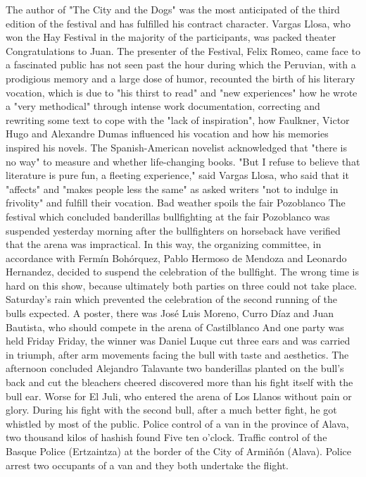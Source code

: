 The author of "The City and the Dogs" was the most anticipated of the third edition of the festival and has fulfilled his contract character.
Vargas Llosa, who won the Hay Festival in the majority of the participants, was packed theater Congratulations to Juan.
The presenter of the Festival, Felix Romeo, came face to a fascinated public has not seen past the hour during which the Peruvian, with a prodigious memory and a large dose of humor, recounted the birth of his literary vocation, which is due to "his thirst to read" and "new experiences" how he wrote a "very methodical" through intense work documentation, correcting and rewriting some text to cope with the "lack of inspiration", how Faulkner, Victor Hugo and Alexandre Dumas influenced his vocation and how his memories inspired his novels.
The Spanish-American novelist acknowledged that "there is no way" to measure and whether life-changing books. "But I refuse to believe that literature is pure fun, a fleeting experience," said Vargas Llosa, who said that it "affects" and "makes people less the same" as asked writers "not to indulge in frivolity" and fulfill their vocation.
Bad weather spoils the fair Pozoblanco
The festival which concluded banderillas bullfighting at the fair Pozoblanco was suspended yesterday morning after the bullfighters on horseback have verified that the arena was impractical.
In this way, the organizing committee, in accordance with Fermín Bohórquez, Pablo Hermoso de Mendoza and Leonardo Hernandez, decided to suspend the celebration of the bullfight.
The wrong time is hard on this show, because ultimately both parties on three could not take place.
Saturday's rain which prevented the celebration of the second running of the bulls expected.
A poster, there was José Luis Moreno, Curro Díaz and Juan Bautista, who should compete in the arena of Castilblanco
And one party was held Friday
Friday, the winner was Daniel Luque cut three ears and was carried in triumph, after arm movements facing the bull with taste and aesthetics.
The afternoon concluded Alejandro Talavante two banderillas planted on the bull's back and cut the bleachers cheered discovered more than his fight itself with the bull ear.
Worse for El Juli, who entered the arena of Los Llanos without pain or glory.
During his fight with the second bull, after a much better fight, he got whistled by most of the public.
Police control of a van in the province of Alava, two thousand kilos of hashish found
Five ten o'clock.
Traffic control of the Basque Police (Ertzaintza) at the border of the City of Armiñón (Alava).
Police arrest two occupants of a van and they both undertake the flight.
